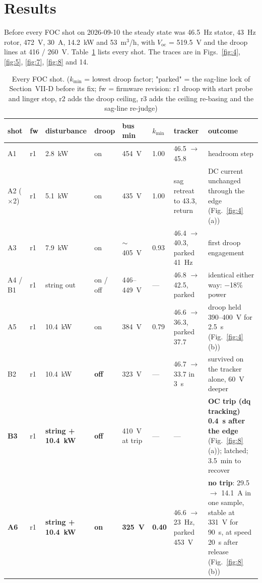\documentclass[journal]{IEEEtran}
\begin{document}
\section{Results}

Before every FOC shot on 2026-09-10 the steady state was 46.5~Hz stator, 43~Hz rotor, 472~V, 30~A, 14.2~kW and 53~m$^{3}$/h, with $V_{\mathrm{oc}}$ = 519.5~V and the droop lines at 416 / 260~V. Table~\ref{tab:1} lists every shot. The traces are in Figs.~\ref{fig:4}, \ref{fig:5}, \ref{fig:7}, \ref{fig:8} and 14.

\begin{table}[!t]\caption{Every FOC shot. ($k_{\min}$ = lowest droop factor; "parked" = the sag-line lock of Section~VII-D before its fix; fw = firmware revision: r1 droop with start probe and linger stop, r2 adds the droop ceiling, r3 adds the ceiling re-basing and the sag-line re-judge)}\label{tab:1}\centering\scriptsize\setlength{\tabcolsep}{3pt}\renewcommand{\arraystretch}{0.9}
\begin{tabularx}{\textwidth}{llXXXXXX}\toprule
shot & fw & disturbance & droop & bus min & $k_{\min}$ & tracker & outcome \\
\midrule
A1 & r1 & 2.8~kW & on & 454~V & 1.00 & 46.5 $\rightarrow$ 45.8 & headroom step \\
A2 ($\times$2) & r1 & 5.1~kW & on & 435~V & 1.00 & sag retreat to 43.3, return & DC current unchanged through the edge (Fig.~\ref{fig:4}(a)) \\
A3 & r1 & 7.9~kW & on & $\sim$405~V & 0.93 & 46.4 $\rightarrow$ 40.3, parked 41~Hz & first droop engagement \\
A4 / B1 & r1 & string out & on / off & 446--449~V & --- & 46.8 $\rightarrow$ 42.5, parked & identical either way: $-$18\% power \\
A5 & r1 & 10.4~kW & on & 384~V & 0.79 & 46.6 $\rightarrow$ 36.3, parked 37.7 & droop held 390--400~V for 2.5~s (Fig.~\ref{fig:4}(b)) \\
B2 & r1 & 10.4~kW & \textbf{off} & 323~V & --- & 46.7 $\rightarrow$ 33.7 in 3~s & survived on the tracker alone, 60~V deeper \\
\textbf{B3} & r1 & \textbf{string + 10.4~kW} & \textbf{off} & 410~V at trip & --- & --- & \textbf{OC trip (dq tracking) 0.4~s after the edge} (Fig.~\ref{fig:8}(a)); latched; 3.5~min to recover \\
\textbf{A6} & r1 & \textbf{string + 10.4~kW} & \textbf{on} & \textbf{325~V} & \textbf{0.40} & 46.6 $\rightarrow$ 23~Hz, parked 453~V & \textbf{no trip}: 29.5 $\rightarrow$ 14.1~A in one sample, stable at 331~V for 90~s, at speed 20~s after release (Fig.~\ref{fig:8}(b)) \\

\end{tabularx}
\end{table}
\end{document}
